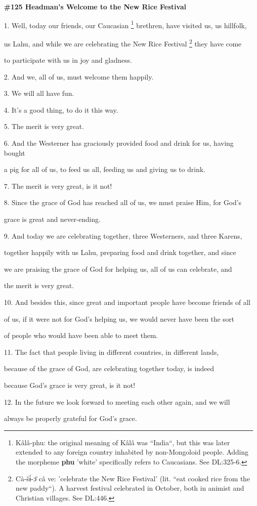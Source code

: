 
\textbf{\#125  Headman's Welcome to the New Rice Festival}

1. Well, today our friends, our Caucasian \footnote{Kâlâ-phu: the original meaning of Kâlâ was ``India``, but this was later extended to any foreign country inhabited by non-Mongoloid people. Adding the morpheme \textbf{phu} 'white' specifically refers to Caucasians. See DL:325-6.} brethren, have visited us, us hillfolk,


us Lahu, and while we are celebrating the New Rice Festival \footnote{Cà-šɨ́-ɔ̄ câ ve: 'celebrate the New Rice Festival' (lit. ``eat cooked rice from the new paddy``). A harvest festival celebrated in October, both in animist and Christian villages. See DL:446.} they have come

to participate with us in joy and gladness.

2. And we, all of us, must welcome them happily.

3. We will all have fun.

4. It's a good thing, to do it this way.

5. The merit is very great.

6. And the Westerner has graciously provided food and drink for us, having bought


a pig for all of us, to feed us all, feeding us and giving us to drink.

7. The merit is very great, is it not!

8. Since the grace of God has reached all of us, we must praise Him, for God's


grace is great and never-ending.

9. And today we are celebrating together, three Westerners, and three Karens,


together happily with us Lahu, preparing food and drink together, and since

we are praising the grace of God for helping us, all of us can celebrate, and


the merit is very great.

10. And besides this, since great and important people have become friends of all


of us, if it were not for God's helping us, we would never have been the sort


of people who would have been able to meet them.

11. The fact that people living in different countries, in different lands,


because of the grace of God, are celebrating together today, is indeed


because God's grace is very great, is it not!

12. In the future we look forward to meeting each other again, and we will


always be properly grateful for God's grace.


